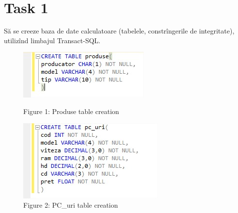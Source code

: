 \section{Task 1}
Să se creeze baza de date calculatoare (tabelele, constrîngerile de integritate), utilizînd limbajul Transact-SQL.

\begin{figure}[H]
	\centering
		\includegraphics[width=\linewidth]{screens/1.jpg}
		\caption*{Figure 1: Produse table creation}
		\label{}
	\endminipage\hfill
		\includegraphics[width=\linewidth]{screens/2.jpg}
		\caption*{Figure 2: PC\_uri table creation}
	\endminipage
\end{figure}

